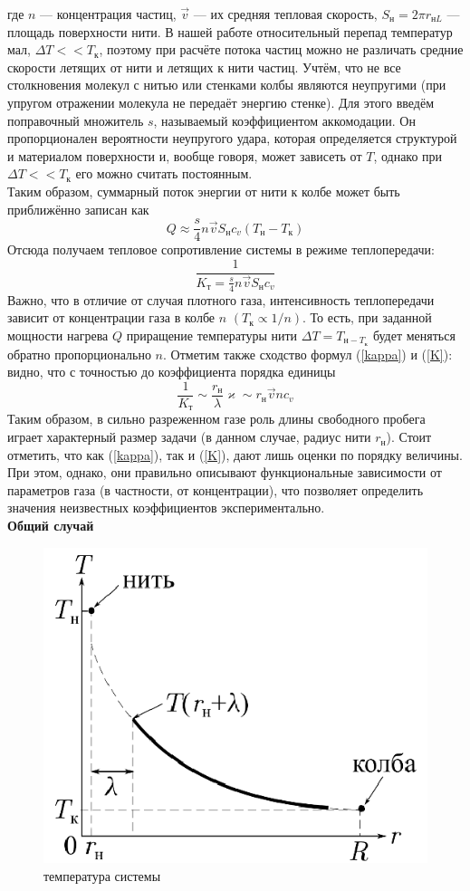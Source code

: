 \documentclass[12pt]{article}
\begin{document}
        где $n$ — концентрация частиц, $\vec{v}$ — их средняя тепловая скорость, $S_\text{н} = 2\pi r_{\text{н}L}$ — площадь поверхности нити.
        В нашей работе относительный перепад температур мал, $\Delta T << T_\text{к}$, поэтому при расчёте потока частиц можно не
        различать средние скорости летящих от нити и летящих к нити частиц. Учтём, что не все столкновения молекул с нитью или
        стенками колбы являются неупругими (при упругом отражении молекула не передаёт энергию
        стенке). Для этого введём поправочный множитель $s$, называемый коэффициентом аккомодации. Он пропорционален вероятности неупругого удара,
        которая определяется структурой и материалом поверхности и, вообще говоря, может зависеть от $T$, однако при $\Delta T << T_{\text{к}}$
        его можно считать постоянным.\\
        Таким образом, суммарный поток энергии от нити к колбе может быть приближённо записан как
        \[
            Q \approx \frac{s}{4} n \vec{v} S_{\text{н}}c_v(T_\text{н}-T_{\text{к}})
        \]
        Отсюда получаем тепловое сопротивление системы в режиме теплопередачи:
        \begin{equation}\label{K}
            \frac{1}{K_{\text{т}} = \frac{s}{4} n \vec{v} S_{\text{н}}c_v}
        \end{equation}
        Важно, что в отличие от случая плотного газа, интенсивность теплопередачи зависит от концентрации газа в колбе $n$ $(T_{\text{к}} \propto 1/n)$. То есть,
        при заданной мощности нагрева $Q$ приращение температуры нити $\Delta T = T_{\text{н}-T_{\text{к}}}$ будет
        меняться обратно пропорционально $n$. Отметим также сходство формул (\ref{kappa}) и (\ref{K}): видно, что с точностью до коэффициента порядка единицы
        \[
            \frac{1}{K_{\text{т}}} \sim \frac{r_{\text{н}}}{\lambda}\varkappa \sim r_{\text{н}}\vec{v}nc_v
        \]
        Таким образом, в сильно разреженном газе роль длины свободного пробега
        играет характерный размер задачи (в данном случае, радиус нити $r_{\text{н}}$). Стоит отметить, что как (\ref{kappa}), так и (\ref{K}), дают лишь оценки по порядку
        величины. При этом, однако, они правильно описывают функциональные зависимости от параметров газа (в частности, от концентрации), что позволяет
        определить значения неизвестных коэффициентов экспериментально.\\
        \textbf{Общий случай}
        \begin{figure}[H]
            \centering
            \includegraphics[width=0.4\linewidth]{system_tempetatute.png}
            \caption{температура системы}
            \label{fig:mpr}
        \end{figure}
\end{document}
